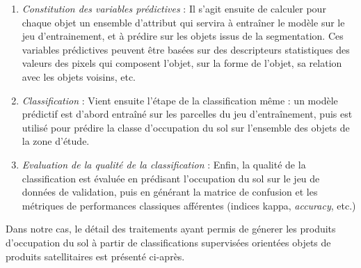 \documentclass[12pt,twoside]{reedthesis}
\begin{document}
\begin{lightcyanbox}
\begin{enumerate}
\item
  \emph{Constitution des variables prédictives} : Il s'agit ensuite de calculer pour chaque objet un ensemble d'attribut qui servira à entraîner le modèle sur le jeu d'entrainement, et à prédire sur les objets issus de la segmentation. Ces variables prédictives peuvent être basées sur des descripteurs statistiques des valeurs des pixels qui composent l'objet, sur la forme de l'objet, sa relation avec les objets voisins, etc.
\item
  \emph{Classification} : Vient ensuite l'étape de la classification même : un modèle prédictif est d'abord entraîné sur les parcelles du jeu d'entraînement, puis est utilisé pour prédire la classe d'occupation du sol sur l'ensemble des objets de la zone d'étude.
\item
  \emph{Evaluation de la qualité de la classification} : Enfin, la qualité de la classification est évaluée en prédisant l'occupation du sol sur le jeu de données de validation, puis en générant la matrice de confusion et les métriques de performances classiques afférentes (indices kappa, \emph{accuracy}, etc.)
\end{enumerate}
\end{lightcyanbox}
\hfill\break

Dans notre cas, le détail des traitements ayant permis de génerer les produits d'occupation du sol à partir de classifications supervisées orientées objets de produits satellitaires est présenté ci-après.\\
\end{document}
